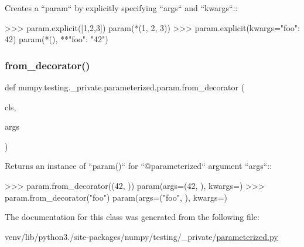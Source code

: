 \begin{DoxyVerb}Creates a ``param`` by explicitly specifying ``args`` and
    ``kwargs``::

>>> param.explicit([1,2,3])
param(*(1, 2, 3))
>>> param.explicit(kwargs={"foo": 42})
param(*(), **{"foo": "42"})\end{DoxyVerb}
 \mbox{\label{classnumpy_1_1testing_1_1__private_1_1parameterized_1_1param_add4062293c0eaa524611c9b37e078938}} 
\subsubsection{\texorpdfstring{from\+\_\+decorator()}{from\_decorator()}}
{\footnotesize\ttfamily def numpy.\+testing.\+\_\+private.\+parameterized.\+param.\+from\+\_\+decorator (\begin{DoxyParamCaption}\item[{}]{cls,  }\item[{}]{args }\end{DoxyParamCaption})}

\begin{DoxyVerb}Returns an instance of ``param()`` for ``@parameterized`` argument
    ``args``::

>>> param.from_decorator((42, ))
param(args=(42, ), kwargs={})
>>> param.from_decorator("foo")
param(args=("foo", ), kwargs={})\end{DoxyVerb}
 

The documentation for this class was generated from the following file\+:\begin{DoxyCompactItemize}
\item 
venv/lib/python3./site-\/packages/numpy/testing/\+\_\+private/\hyperlink{parameterized_8py}{parameterized.\+py}\end{DoxyCompactItemize}
